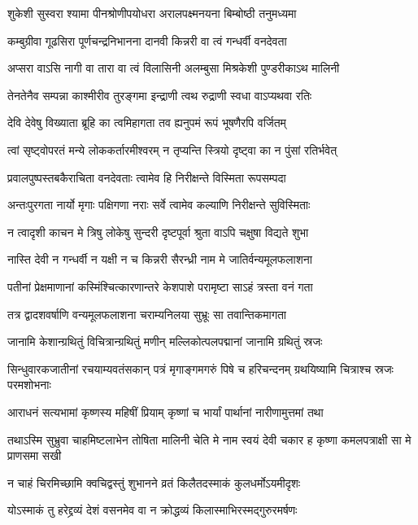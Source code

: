 \twolineshloka
{शुकेशी सुस्वरा श्यामा पीनश्रोणीपयोधरा}
{अरालपक्ष्मनयना बिम्बोष्ठी तनुमध्यमा}


\twolineshloka
{कम्बुग्रीवा गूढसिरा पूर्णचन्द्रनिभानना}
{दानवी किन्नरी वा त्वं गन्धर्वी वनदेवता}


\twolineshloka
{अप्सरा वाऽसि नागी वा तारा वा त्वं विलासिनी}
{अलम्बुसा मिश्रकेशी पुण्डरीकाऽथ मालिनी}


\twolineshloka
{तेनतेनैव सम्पन्ना काश्मीरीव तुरङ्गमा}
{इन्द्राणी त्वथ रुद्राणी स्वधा वाऽप्यथवा रतिः}


\twolineshloka
{देवि देवेषु विख्याता ब्रूहि का त्वमिहागता}
{तव ह्यनुपमं रूपं भूषणैरपि वर्जितम्}


\twolineshloka
{त्वां सृष्ट्वोपरतं मन्ये लोककर्तारमीश्वरम्}
{न तृप्यन्ति स्त्रियो दृष्ट्वा का न पुंसां रतिर्भवेत्}


\twolineshloka
{प्रवालपुष्पस्तबकैराचिता वनदेवताः}
{त्वामेव हि निरीक्षन्ते विस्मिता रूपसम्पदा}


\twolineshloka
{अन्तःपुरगता नार्यो मृगाः पक्षिगणा नराः}
{सर्वे त्वामेव कल्याणि निरीक्षन्ते सुविस्मिताः}


\twolineshloka
{न त्वादृशी काचन मे त्रिषु लोकेषु सुन्दरी}
{दृष्टपूर्वा श्रुता वाऽपि चक्षुषा विद्यते शुभा}




\twolineshloka
{नास्ति देवी न गन्धर्वी न यक्षी न च किन्नरी}
{सैरन्ध्री नाम मे जातिर्वन्यमूलफलाशना}


\twolineshloka
{पतीनां प्रेक्षमाणानां कस्मिंश्चित्कारणान्तरे}
{केशपाशे परामृष्टा साऽहं त्रस्ता वनं गता}


\twolineshloka
{तत्र द्वादशवर्षाणि वन्यमूलफलाशना}
{चराम्यनिलया सुभ्रूः सा तवान्तिकमागता}


\twolineshloka
{जानामि केशान्ग्रथितुं विचित्रान्ग्रथितुं मणीन्}
{मल्लिकोत्पलपद्मानां जानामि ग्रथितुं स्रजः}


\threelineshloka
{सिन्धुवारकजातीनां रचयाम्यवतंसकान्}
{पत्रं मृगाङ्गमगरुं पिषे च हरिचन्दनम्}
{ग्रथयिष्यामि चित्राश्च स्रजः परमशोभनाः}


\twolineshloka
{आराधनं सत्यभामां कृष्णस्य महिषीं प्रियाम्}
{कृष्णां च भार्यां पार्थानां नारीणामुत्तमां तथा}


\threelineshloka
{तथाऽस्मि सुभ्रुवा चाहमिष्टलाभेन तोषिता}
{मालिनी चेति मे नाम स्वयं देवी चकार ह}
{कृष्णा कमलपत्राक्षी सा मे प्राणसमा सखी}


\twolineshloka
{न चाहं चिरमिच्छामि क्वचिद्वस्तुं शुभानने}
{व्रतं किलैतदस्माकं कुलधर्मोऽयमीदृशः}


\twolineshloka
{योऽस्माकं तु हरेद्द्रव्यं देशं वसनमेव वा}
{न क्रोद्धव्यं किलास्माभिरस्मद्गुरुरमर्षणः}



